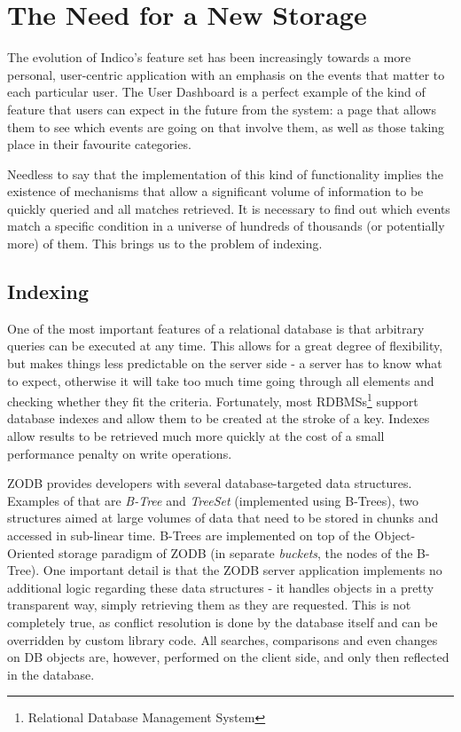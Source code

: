 \section{The Need for a New Storage}

The evolution of Indico's feature set has been increasingly towards a more personal, user-centric application with an emphasis on the events that matter to each particular user. The User Dashboard is a perfect example of the kind of feature that users can expect in the future from the system: a page that allows them to see which events are going on that involve them, as well as those taking place in their favourite categories.

Needless to say that the implementation of this kind of functionality implies the existence of mechanisms that allow a significant volume of information to be quickly queried and all matches retrieved. It is necessary to find out which events match a specific condition in a universe of hundreds of thousands (or potentially more) of them. This brings us to the problem of indexing.

\subsection{Indexing}

One of the most important features of a relational database is that arbitrary queries can be executed at any time. This allows for a great degree of flexibility, but makes things less predictable on the server side - a server has to know what to expect, otherwise it will take too much time going through all elements and checking whether they fit the criteria. Fortunately, most RDBMSs\footnote{Relational Database Management System} support database indexes and allow them to be created at the stroke of a key. Indexes allow results to be retrieved much more quickly at the cost of a small performance penalty on write operations.

\textsc{ZODB} provides developers with several database-targeted data structures. Examples of that are \textit{B-Tree} and \textit{TreeSet} (implemented using B-Trees), two structures aimed at large volumes of data that need to be stored in chunks and accessed in sub-linear time. B-Trees are implemented on top of the Object-Oriented storage paradigm of \textsc{ZODB} (in separate \textit{buckets}, the nodes of the B-Tree). One important detail is that the \textsc{ZODB} server application implements no additional logic regarding these data structures - it handles objects in a pretty transparent way, simply retrieving them as they are requested. This is not completely true, as conflict resolution is done by the database itself and can be overridden by custom library code. All searches, comparisons and even changes on DB objects are, however, performed on the client side, and only then reflected in the database.

